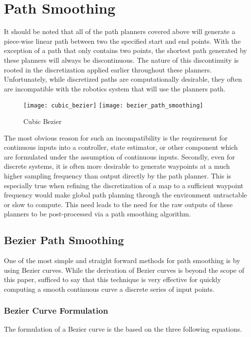 \section{Path Smoothing}
It should be noted that all of the path planners covered above will generate a piece-wise linear path between two the specified start and end points. With the exception of a path that only contains two points, the shortest path generated by these planners will always be discontinuous. The nature of this discontinuity is rooted in the discretization applied earlier throughout these planners. Unfortunately, while discretized paths are computationally desirable, they often are incompatible with the robotics system that will use the planners path.

\begin{figure}[h]
    \texttt{[image: cubic\_bezier]}
    \texttt{[image: bezier\_path\_smoothing]}
    \centering
    \label{fig:bezier}
    \caption{Cubic Bezier}
  \end{figure}

The most obvious reason for such an incompatibility is the requirement for continuous inputs into a controller, state estimator, or other component which are formulated under the assumption of continuous inputs. Secondly, even for discrete systems, it is often more desirable to generate waypoints at a much higher sampling frequency than output directly by the path planner. This is especially true when refining the discretization of a map to a sufficient waypoint frequency would make global path planning through the environment untractable or slow to compute. This need leads to the need for the raw outputs of these planners to be post-processed via a path smoothing algorithm. 

\subsection{Bezier Path Smoothing}
One of the most simple and straight forward methods for path smoothing is by using Bezier curves. While the derivation of Bezier curves is beyond the scope of this paper, sufficed to say that this technique is very effective for quickly computing a smooth continuous curve a discrete series of input points.
\newline

\subsubsection{Bezier Curve Formulation}
The formulation of a Bezier curve is the based on the three following equations. 

